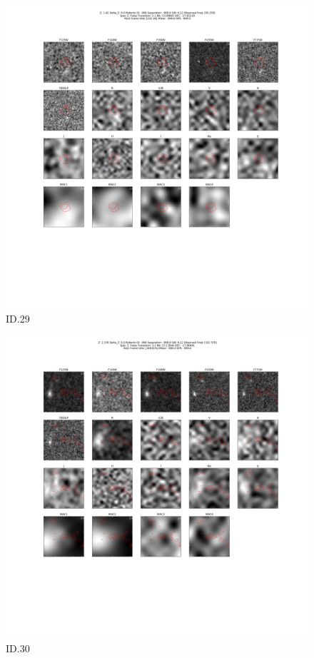 \begin{figure}[tbp]
\centering \includegraphics[width=120mm]{Matched/ASPECS_Cutout_29.png}
\caption{ID.29}
\label{fig:Match_Three}
\end{figure}

\begin{figure}[tbp]
\centering \includegraphics[width=120mm]{Matched/ASPECS_Cutout_30.png}
\caption{ID.30}
\label{fig:Match_Three}
\end{figure}

